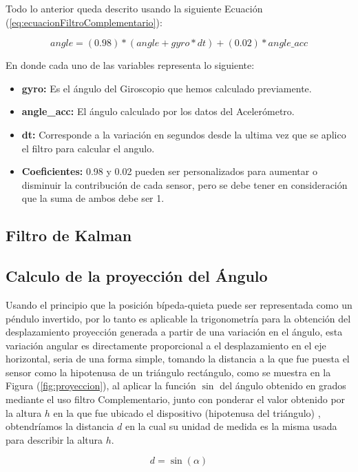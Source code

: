\documentclass[12pt,a4paper]{article}
\begin{document}
Todo lo anterior queda descrito usando la siguiente Ecuación (\ref{eq:ecuacionFiltroComplementario}):

\begin{equation}
\label{eq:ecuacionFiltroComplementario}
angle = (0.98)*(angle+gyro*dt)+(0.02)*angle\_acc
\end{equation}

En donde cada uno de las variables representa lo siguiente:
\begin{itemize}
\item \textbf{gyro:} Es el ángulo del Giroscopio que hemos calculado previamente.
\item \textbf{angle\_acc:} El ángulo calculado por los datos del Acelerómetro.
\item \textbf{dt:} Corresponde a la variación en segundos desde la ultima vez que se aplico el filtro para calcular el angulo.
\item \textbf{Coeficientes:}  0.98 y 0.02 pueden ser personalizados para aumentar o disminuir la contribución de cada sensor, pero se debe tener en consideración que la suma de ambos debe ser 1.
\end{itemize}

\subsection{Filtro de Kalman}

\subsection{Calculo de la proyección del Ángulo}
 Usando el principio que la posición bípeda-quieta puede ser representada como un péndulo invertido, por lo tanto es aplicable la trigonometría para la obtención del desplazamiento proyección generada a partir de una variación en el ángulo, esta variación angular es directamente proporcional a el desplazamiento en el eje horizontal, seria de una forma simple, tomando la distancia a la que fue puesta el sensor como la hipotenusa de un triángulo rectángulo, como se muestra en la Figura (\ref{fig:proyeccion}), al aplicar la función $\sin$ del ángulo obtenido en grados mediante el uso filtro Complementario, junto con ponderar el valor obtenido por la altura $h$ en la que fue ubicado el dispositivo (hipotenusa del triángulo) , obtendríamos la distancia $d$ en la cual su unidad de medida es la misma usada para describir la altura $h$.
 
 \begin{figure}[H]
\begin{equation}
\label{eq:proyeccion}
d=\sin(\alpha)
\end{equation}
\end{figure}
\end{document}
